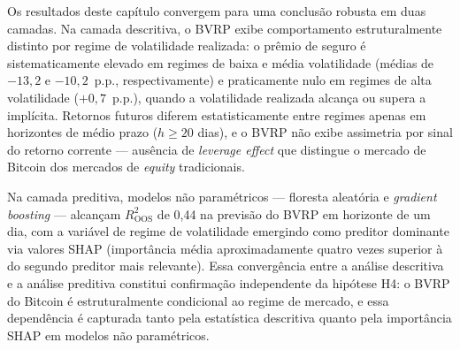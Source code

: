 Os resultados deste capítulo convergem para uma conclusão
robusta em duas camadas. Na camada descritiva, o BVRP exibe
comportamento estruturalmente distinto por regime de
volatilidade realizada: o prêmio de seguro é sistematicamente
elevado em regimes de baixa e média volatilidade
(médias de $-13{,}2$ e $-10{,}2$~p.p., respectivamente)
e praticamente nulo em regimes de alta volatilidade
($+0{,}7$~p.p.), quando a volatilidade realizada alcança
ou supera a implícita. Retornos futuros diferem
estatisticamente entre regimes apenas em horizontes
de médio prazo ($h \geq 20$ dias), e o BVRP não exibe
assimetria por sinal do retorno corrente --- ausência de
\textit{leverage effect} que distingue o mercado de
Bitcoin dos mercados de \textit{equity} tradicionais.

Na camada preditiva, modelos não paramétricos --- floresta
aleatória e \textit{gradient boosting} --- alcançam
$R^2_{\text{OOS}}$ de 0{,}44 na previsão do BVRP em
horizonte de um dia, com a variável de regime de volatilidade
emergindo como preditor dominante via valores SHAP (importância
média aproximadamente quatro vezes superior à do segundo
preditor mais relevante). Essa convergência entre a análise
descritiva e a análise preditiva constitui confirmação
independente da hipótese H4: o BVRP do Bitcoin é
estruturalmente condicional ao regime de mercado,
e essa dependência é capturada tanto pela estatística
descritiva quanto pela importância SHAP em modelos
não paramétricos.
